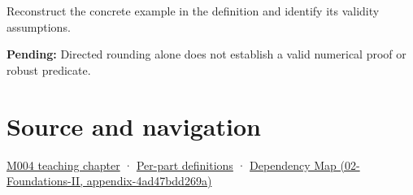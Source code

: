 Reconstruct the concrete example in the definition and identify its validity assumptions.

\textbf{Pending:} Directed rounding alone does not establish a valid numerical proof or robust predicate.

\section{Source and navigation}\label{appendix-1823a14330cb-source-and-navigation}

\href{Continuous\%20Notes/Computing\%20Foundations\%20-\%20From\%20Bits\%20to\%20C++\%20and\%20Systems\%20APIs\#A\%20stretching\%20ruler\%20for\%20real-valued\%20quantities}{M004 teaching chapter} · \hyperref[appendix-fd090d982a15-m004---parts-61-76]{Per-part definitions} · \href{../02-Foundations-II/main.pdf\#nameddest=appendix-4ad47bdd269a}{Dependency Map (02-Foundations-II, appendix-4ad47bdd269a)}
